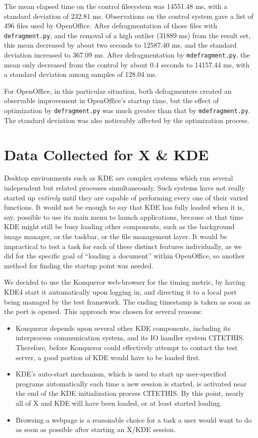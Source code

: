 \documentclass[10pt,twocolumn,letterpaper]{article}
\begin{document}
The mean elapsed time on the control filesystem was 14551.48 ms, with a standard deviation of 232.81 ms. Observations on the control system gave a list of 496 files used by OpenOffice. After
defragmentation of those files with \texttt{defragment.py}, and the removal of a high outlier (31889 ms) from the result set, this mean decreased by about two seconds to 12587.40 ms, and the standard deviation increased to 367.09 ms. After defragmentation by \texttt{mdefragment.py}, the mean only decreased from the control by about 0.4 seconds to 14157.44 ms, with a standard deviation among samples of 128.04 ms.

For OpenOffice, in this particular situation, both defragmenters created an observable improvement in OpenOffice's startup time, but the effect of optimization by \texttt{defragment.py} was much greater than that by \texttt{mdefragment.py}. The standard deviation was also noticeably affected by the optimization process.

\section{Data Collected for X \& KDE}

Desktop environments such as KDE are complex systems which run several independent but related processes simultaneously. Such systems have not really started up \emph{entirely} until they are capable of performing every one of their varied functions. It would not be enough to say that KDE has fully loaded when it is, say, possible to use its main menu to launch applications, because at that time KDE might still be busy loading other components, such as the background image manager, or the taskbar, or the file management layer. It would be impractical to test a task for each of these distinct features individually, as we did for the specific goal of ``loading a document'' within OpenOffice, so another method for finding the startup point was needed.

We decided to use the Konqueror web-browser for the timing metric, by having KDE4 start it automatically upon logging in, and directing it to a local port being managed by the test framework. The ending timestamp is taken as soon as the port is opened. This approach was chosen for several reasons:
\begin{itemize}
\item Konqueror depends upon several other KDE components, including its interprocess communication system, and its IO handler system CITETHIS. Therefore, before Konqueror could effectively attempt to contact the test server, a good portion of KDE would have to be loaded first.
\item KDE's auto-start mechanism, which is used to start up user-specified programs automatically each time a new session is started, is activated near the end of the KDE initialization process CITETHIS. By this point, nearly all of X and KDE will have been loaded, or at least started loading.
\item Browsing a webpage is a reasonable choice for a task a user would want to do as soon as possible after starting an X/KDE session. 
\end{itemize}
\end{document}
